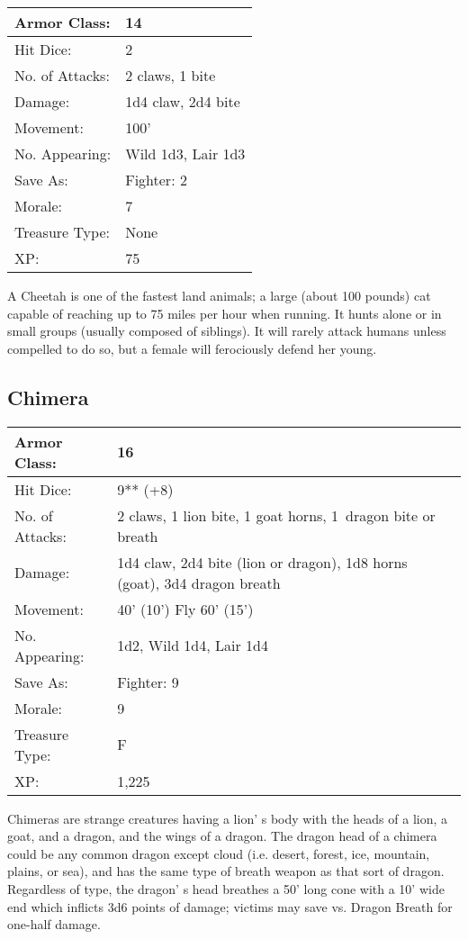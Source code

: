 \documentclass[a4paper,twoside,openany,10pt]{book}
\begin{document}
\begin{multicols}{2}
\begin{tabularx}{0.48\textwidth}{@{}lX@{}}
Armor Class: & 14 \\\hline
Hit Dice: & 2 \\\hline
No. of Attacks: & 2 claws, 1 bite \\\hline
Damage: & 1d4 claw, 2d4 bite \\\hline
Movement: & 100' \\\hline
No. Appearing: & Wild 1d3, Lair 1d3 \\\hline
Save As: & Fighter: 2 \\\hline
Morale: & 7 \\\hline
Treasure Type: & None \\\hline
XP: & 75 \\\hline
\end{tabularx}\medskip

A Cheetah is one of the fastest land animals; a large (about 100 pounds) cat capable of reaching up to 75 miles per hour when running. It hunts alone or in small groups (usually composed of siblings). It will rarely attack humans unless compelled to do so, but a female will ferociously defend her young.

\subsection*{Chimera}\label{chimera}

\begin{tabularx}{0.48\textwidth}{@{}lX@{}}
Armor Class: & 16 \\\hline
Hit Dice: & 9** (+8) \\\hline
No. of Attacks: & 2 claws, 1 lion bite, 1 goat horns, 1~dragon bite or
breath \\\hline
Damage: & 1d4 claw, 2d4 bite (lion or dragon), 1d8 horns (goat), 3d4
dragon breath \\\hline
Movement: & 40' (10') Fly
60' (15') \\\hline
No. Appearing: & 1d2, Wild 1d4, Lair 1d4 \\\hline
Save As: & Fighter: 9 \\\hline
Morale: & 9 \\\hline
Treasure Type: & F \\\hline
XP: & 1,225 \\\hline
\end{tabularx}\medskip

Chimeras are strange creatures having a lion' s body with the heads of a lion, a goat, and a dragon, and the wings of a dragon. The dragon head of a chimera could be any common dragon except cloud (i.e. desert, forest, ice, mountain, plains, or sea), and has the same type of breath weapon as that sort of dragon. Regardless of type, the dragon' s head breathes a 50' long cone with a 10' wide end which inflicts 3d6 points of damage; victims may save vs. Dragon Breath for one-half damage.


\end{multicols}
\end{document}
